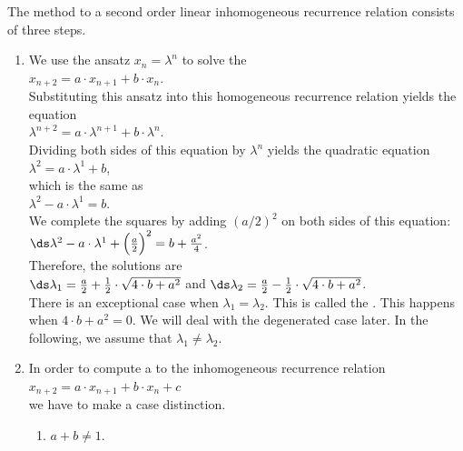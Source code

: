 \noindent
The method to  a second order linear inhomogeneous recurrence relation consists of three steps.
\begin{enumerate}
\item We use the ansatz $x_n = \lambda^n$ to solve the 
      \\[0.2cm]
      \hspace*{1.3cm}
      $x_{n+2} = a \cdot x_{n+1} + b \cdot x_n$.
      \\[0.2cm]
      Substituting this ansatz into this homogeneous recurrence relation yields the equation
      \\[0.2cm]
      \hspace*{1.3cm}
      $\lambda^{n+2} = a \cdot \lambda^{n+1} + b \cdot \lambda^n$.
      \\[0.2cm]
      Dividing both sides of this equation by $\lambda^n$ yields the quadratic equation
      \\[0.2cm]
      \hspace*{1.3cm}
      $\lambda^{2} = a \cdot \lambda^{1} + b$,
      \\[0.2cm]
      which is the same as
      \\[0.2cm]
      \hspace*{1.3cm}
      $\lambda^{2} - a \cdot \lambda^{1} = b$.
      \\[0.2cm]
      We complete the squares by adding $(a/2)^2$ on both sides of this equation:
      \\[0.2cm]
      \hspace*{1.3cm}
      $\ds \lambda^{2} - a \cdot \lambda^{1} + \Bigl(\frac{a}{2}\Bigr)^2 = b + \frac{a^2}{4}$.
      \\[0.2cm]
      Therefore, the solutions are
      \\[0.2cm]
      \hspace*{1.3cm}
      $\ds\lambda_1 = \frac{a}{2} + \frac{1}{2} \cdot \sqrt{4 \cdot b + a^2}$ \quad and \quad
      $\ds\lambda_2 = \frac{a}{2} - \frac{1}{2} \cdot \sqrt{4 \cdot b + a^2}$.
      \\[0.2cm]
      There is an exceptional case when $\lambda_1 = \lambda_2$.  This is called the 
      .
      This happens when $4 \cdot b + a^2 = 0$.  We will deal with the degenerated case later.  In the
      following, we assume that $\lambda_1 \not= \lambda_2$.
\item In order to compute a   to the inhomogeneous recurrence relation
      \\[0.2cm]
      \hspace*{1.3cm}
      $x_{n+2} = a \cdot x_{n+1} + b \cdot x_n + c$
      \\[0.2cm]
      we have to make a case distinction.
      \begin{enumerate}
      \item $a + b \not= 1$.


\end{enumerate}
\end{enumerate}
